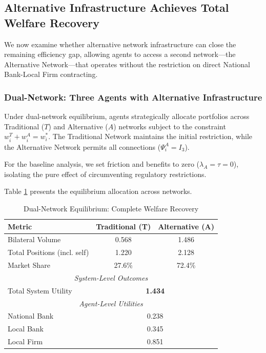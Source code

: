 \documentclass[12pt]{article}
\begin{document}
\subsection{Alternative Infrastructure Achieves Total Welfare Recovery}
\label{sec:dual_network_results}

We now examine whether alternative network infrastructure can close the remaining efficiency gap, allowing agents to access a second network---the Alternative Network---that operates without the restriction on direct National Bank-Local Firm contracting.

\subsubsection{Dual-Network: Three Agents with Alternative Infrastructure}

Under dual-network equilibrium, agents strategically allocate portfolios across Traditional ($T$) and Alternative ($A$) networks subject to the constraint $w_i^T + w_i^A = w_i^*$. The Traditional Network maintains the initial restriction, while the Alternative Network permits all connections ($\Psi_i^A = I_3$).

For the baseline analysis, we set friction and benefits to zero ($\lambda_A = \tau = 0$), isolating the pure effect of circumventing regulatory restrictions.

Table \ref{tab:dual_network_main} presents the equilibrium allocation across networks.

\begin{table}[h]
\centering
\caption{Dual-Network Equilibrium: Complete Welfare Recovery}
\label{tab:dual_network_main}
\begin{tabular}{lcc}
\toprule
\textbf{Metric} & \textbf{Traditional (T)} & \textbf{Alternative (A)} \\
\midrule
Bilateral Volume & 0.568 & 1.486 \\
Total Positions (incl. self) & 1.220 & 2.128 \\
Market Share & 27.6\% & 72.4\% \\
\midrule
\multicolumn{3}{c}{\textit{System-Level Outcomes}} \\
\midrule
Total System Utility & \multicolumn{2}{c}{\textbf{1.434}} \\
\midrule
\multicolumn{3}{c}{\textit{Agent-Level Utilities}} \\
\midrule
National Bank & \multicolumn{2}{c}{0.238} \\
Local Bank & \multicolumn{2}{c}{0.345} \\
Local Firm & \multicolumn{2}{c}{0.851} \\
\bottomrule
\end{tabular}
\end{table}
\end{document}
